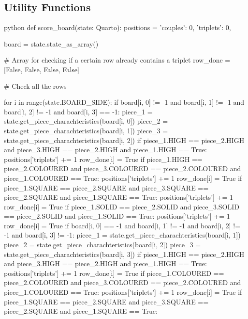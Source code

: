 \subsection{Utility Functions}

\begin{mintedbox}{python}
def score_board(state: Quarto):
    positions = {
        'couples': 0,
        'triplets': 0,
    }

    board = state.state_as_array()

    # Array for checking if a certain row already contains a triplet
    row_done = [False, False, False, False]

    # Check all the rows

    for i in range(state.BOARD_SIDE):
        if board[i, 0] != -1 and board[i, 1] != -1 and board[i, 2] != -1 and board[i, 3] == -1:
            piece_1 = state.get_piece_charachteristics(board[i, 0])
            piece_2 = state.get_piece_charachteristics(board[i, 1])
            piece_3 = state.get_piece_charachteristics(board[i, 2])
            if piece_1.HIGH == piece_2.HIGH and piece_3.HIGH == piece_2.HIGH and piece_1.HIGH == True:
                positions['triplets'] += 1
                row_done[i] = True
            if piece_1.HIGH == piece_2.COLOURED and piece_3.COLOURED == piece_2.COLOURED and piece_1.COLOURED == True:
                positions['triplets'] += 1
                row_done[i] = True
            if piece_1.SQUARE == piece_2.SQUARE and piece_3.SQUARE == piece_2.SQUARE and piece_1.SQUARE == True:
                positions['triplets'] += 1
                row_done[i] = True
            if piece_1.SOLID == piece_2.SOLID and piece_3.SOLID == piece_2.SOLID and piece_1.SOLID == True:
                positions['triplets'] += 1
                row_done[i] = True
        if board[i, 0] == -1 and board[i, 1] != -1 and board[i, 2] != -1 and board[i, 3] != -1:
            piece_1 = state.get_piece_charachteristics(board[i, 1])
            piece_2 = state.get_piece_charachteristics(board[i, 2])
            piece_3 = state.get_piece_charachteristics(board[i, 3])
            if piece_1.HIGH == piece_2.HIGH and piece_3.HIGH == piece_2.HIGH and piece_1.HIGH == True:
                positions['triplets'] += 1
                row_done[i] = True
            if piece_1.COLOURED == piece_2.COLOURED and piece_3.COLOURED == piece_2.COLOURED and piece_1.COLOURED == True:
                positions['triplets'] += 1
                row_done[i] = True
            if piece_1.SQUARE == piece_2.SQUARE and piece_3.SQUARE == piece_2.SQUARE and piece_1.SQUARE == True:

\end{mintedbox}
